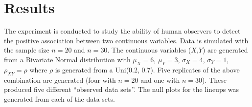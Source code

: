 

\section{Results}\label{results}
The experiment is conducted to study the ability of human observers to detect the positive association between two continuous variables. Data is simulated with the sample size $n = 20$ and $n=30$. The continuous variables ($X$,$Y$) are generated from a Bivariate Normal distribution with $\mu_X = 6$, $\mu_Y = 3$, $\sigma_X = 4$, $\sigma_Y = 1$, $\rho_{XY} = \rho$ where $\rho$ is generated from a Uni(0.2, 0.7). Five replicates of the above combination are generated (four with $n =20$ and one with $n=30$). These produced five different ``observed data sets''. The null plots for the lineups was generated from each of the data sets. \\


